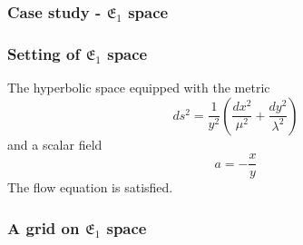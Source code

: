 \documentclass[aspectratio=169]{beamer}
\begin{document}
\begin{frame}
    \frametitle{Case study - $\mathfrak{E}_1$ space}
    \begin{figure}[ht]\centering
    \end{figure}
\end{frame}


\begin{frame}
    \frametitle{Setting of $\mathfrak{E}_1$ space}
    The hyperbolic space equipped with the metric
    \[
        ds^2 = \frac{1}{y^2}(\frac{dx^2}{\mu^2} + \frac{dy^2}{\lambda^2})
    \]
    and a scalar field
    \[
        a = - \frac{x}{y}
    \]
    The flow equation is satisfied.
\end{frame}

\begin{frame}
    \frametitle{A grid on $\mathfrak{E}_1$ space}
    \begin{figure}[ht]\centering
    \end{figure}
\end{frame}
\end{document}
